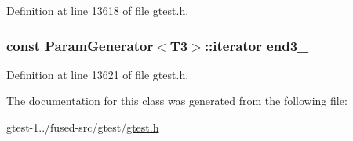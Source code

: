 \-Definition at line 13618 of file gtest.\-h.

\hypertarget{classtesting_1_1internal_1_1CartesianProductGenerator3_1_1Iterator_a41f5fcf2148ca9237a3157b3cb8599b4}{
\subsubsection[{end3\-\_\-}]{\setlength{\rightskip}{0pt plus 5cm}const {\bf \-Param\-Generator}$<$\-T3$>$\-::iterator {\bf end3\-\_\-}}}\label{dd/dcf/classtesting_1_1internal_1_1CartesianProductGenerator3_1_1Iterator_a41f5fcf2148ca9237a3157b3cb8599b4}


\-Definition at line 13621 of file gtest.\-h.



\-The documentation for this class was generated from the following file\-:\begin{DoxyCompactItemize}
\item 
gtest-\/1../fused-\/src/gtest/\hyperlink{fused-src_2gtest_2gtest_8h}{gtest.\-h}\end{DoxyCompactItemize}
